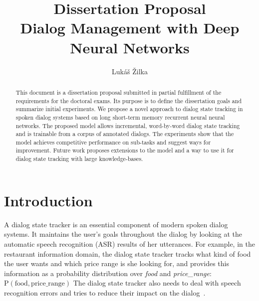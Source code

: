 \documentclass[runningheads,a4paper]{llncs}
\title{
{\large \textnormal{Dissertation Proposal}} \\
Dialog Management with Deep Neural Networks
}
\author{Lukáš Žilka}
\institute{
Institute of Formal and Applied Linguistics \\
Faculty of Matematics and Physics \\
Charles University in Prague \\
\mailsa\\
}
\date{}
\begin{document}



\mainmatter

\maketitle



\begin{abstract}
This document is a dissertation proposal submitted in partial fulfillment of the requirements for the doctoral exams. Its purpose is to define the dissertation goals and summarize initial experiments. We propose a novel approach to dialog state tracking in spoken dialog systems based on long short-term memory recurrent neural neural networks. The proposed model allows incremental, word-by-word dialog state tracking and is trainable from a corpus of annotated dialogs. The experiments show that the model achieves competitive performance on sub-tasks and suggest ways for improvement. Future work proposes extensions to the model and a way to use it for dialog state tracking with large knowledge-bases.
\end{abstract}

\section{Introduction}


A dialog state tracker is an essential component of modern spoken dialog systems. It maintains the user's goals throughout the dialog by looking at the automatic speech recognition (ASR) results of her utterances. For example, in the restaurant information domain, the dialog state tracker tracks what kind of food the user wants and which price range is she looking for, and provides this information as a probability distribution over \emph{food} and \emph{price\_range}: $\operatorname{P(\mbox{food}, \mbox{price\_range})}$ The dialog state tracker also needs to deal with speech recognition errors and tries to reduce their impact on the dialog~\cite{williams2013dialog}.
\end{document}
